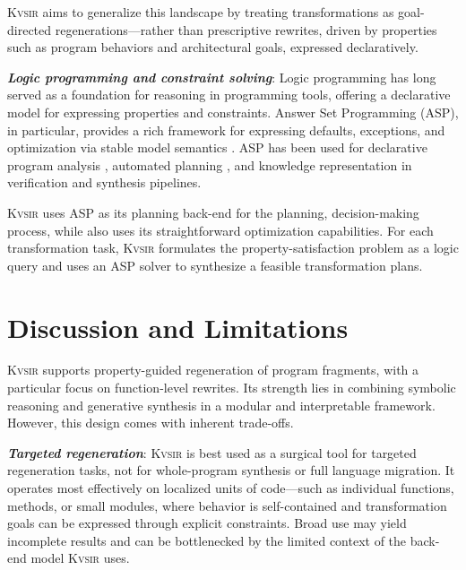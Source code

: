 \documentclass[sigplan,review,anonymous,10pt]{acmart}
\newcommand{\sys}{{\scshape Kv{\textalpha}sir}\xspace}
\newcommand{\heading}[1]{\vspace{2pt}\noindent\textbf{\emph{#1}}:\enspace}
\begin{document}
\sys aims to generalize this landscape by treating transformations as
goal-directed regenerations---rather than prescriptive rewrites, driven by
properties such as program behaviors and architectural goals, expressed declaratively.

\heading{Logic programming and constraint solving}
Logic programming has long served as a foundation for reasoning in programming
tools, offering a declarative model for expressing properties and constraints.
Answer Set Programming (ASP), in particular, provides a rich framework for
expressing defaults, exceptions, and optimization via stable model semantics
\cite{Gelfond_2000, Gelfond_2002, Eiter_2009}. 
ASP has been used for
declarative program analysis \cite{benton2007interactive}, automated planning
\cite{nguyen2020explainable, son2022answersetplanningsurvey}, and knowledge
representation in verification and synthesis pipelines.

\sys uses ASP as its planning back-end for the planning, decision-making
process, while also uses its straightforward optimization capabilities.
For each transformation task, \sys formulates the property-satisfaction problem as a logic query and uses an ASP solver to
synthesize a feasible transformation plans.

\section{Discussion and Limitations}
\label{sec:discussion}

\sys supports property-guided regeneration of program fragments, with a
particular focus on function-level rewrites. Its strength lies in combining
symbolic reasoning and generative synthesis in a modular and interpretable
framework. However, this design comes with inherent trade-offs.

\heading{Targeted regeneration}
\sys is best used as a surgical tool for targeted regeneration tasks, not for whole-program synthesis or full language migration.
It operates most effectively on localized units of code---such as individual functions, methods, or small modules, where behavior is self-contained and transformation goals can be expressed through explicit constraints.
Broad use may yield incomplete results and can be bottlenecked by the limited context of the back-end model \sys uses.
\end{document}
